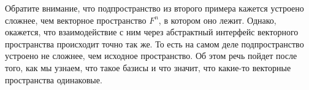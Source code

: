 Обратите внимание, что подпространство из второго примера кажется устроено сложнее, чем векторное пространство $F^n$, в котором оно лежит.
Однако, окажется, что взаимодействие с ним через абстрактный интерфейс векторного пространства происходит точно так же.
То есть на самом деле подпространство устроено не сложнее, чем исходное пространство.
Об этом речь пойдет после того, как мы узнаем, что такое базисы и что значит, что какие-то векторные пространства одинаковые.
